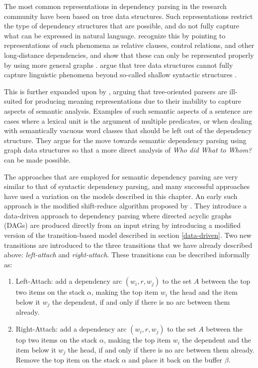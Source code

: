 The most common representations in dependency parsing in the research community have been based on tree data structures. Such representations restrict the type of dependency structures that are possible, and do not fully capture what can be expressed in natural language. \citeauthor{Hudson:90} recognize this by pointing to representations of such phenomena as relative clauses, control relations, and other long-distance dependencies, and show that these can only be represented properly by using more general graphs \cite{Hudson:90}. \citeauthor{Sagae:Tsuji:08} argue that tree data structures cannot fully capture linguistic phenomena beyond so-called shallow syntactic structures \cite{Sagae:Tsuji:08}.

This is further expanded upon by , arguing that tree-oriented parsers are ill-suited for producing meaning representations due to their inability to capture aspects of semantic analysis. Examples of such semantic aspects of a sentence are cases where a lexical unit is the argument of multiple predicates, or when dealing with semantically vacuous word classes that should be left out of the dependency structure. They argue for the move towards semantic dependency parsing using graph data structures so that a more direct analysis of \textit{Who did What to Whom?} can be made possible.

The approaches that are employed for semantic dependency parsing are very similar to that of syntactic dependency parsing, and many successful approaches have used a variation on the models described in this chapter. An early such approach is the modified shift-reduce algorithm proposed by . They introduce a data-driven approach to dependency parsing where directed acyclic graphs (DAGs) are produced directly from an input string by introducing a modified version of the transition-based model described in section \ref{data-driven}. Two new transitions are introduced to the three transitions that we have already described above: \textit{left-attach} and \textit{right-attach}. These transitions can be described informally as:

\begin{enumerate}
\item Left-Attach: add a dependency arc $(w_i, r, w_j)$ to the set $A$ between the top two items on the stack $\alpha$, making the top item $w_i$ the head and the item below it $w_j$ the dependent, if and only if there is no arc between them already.
\item Right-Attach: add a dependency arc $(w_i, r, w_j)$ to the set $A$ between the top two items on the stack $\alpha$, making the top item $w_i$ the dependent and the item below it $w_j$ the head, if and only if there is no arc between them already. Remove the top item on the stack $\alpha$ and place it back on the buffer $\beta$.
\end{enumerate}

